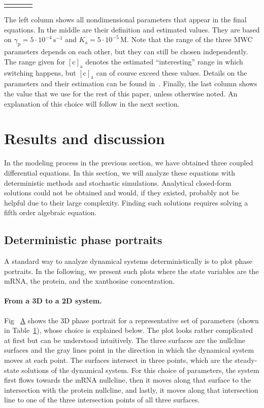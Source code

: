 \documentclass[10pt,letterpaper]{article}
\newlength\savedwidth
\newcommand\thickhline{\noalign{\global\savedwidth\arrayrulewidth\global\arrayrulewidth 2pt}%
	\hline
	\noalign{\global\arrayrulewidth\savedwidth}}
\newcommand{\unit}[1]{\,\mathrm{#1}}
\newcommand{\n}[1]{\mathrm{#1}}
\newcommand\subref[2]{%
	\def\myref{\getrefnumber{#1}}%
	\hyperref[#1]{\myref\mbox{#2}}%
}
\begin{document}
\begin{table}
\begin{tabular}{rllr}
			\thickhline
		\end{tabular}
		\begin{flushleft} 
			The left column shows all nondimensional parameters that appear in
			the final equations. In the middle are their definition and
			estimated values. They are based on $\gamma_{\n{p}} = 5 \cdot
			10^{-4} \unit{s^{-1}}$ and $K_{\n{a}} = 5 \cdot 10^{-5} \unit{M}$.
			Note that the range of the three MWC parameters depends on each
			other, but they can still be chosen independently. The range given
			for $\n{[c]_{a}}$ denotes the estimated ``interesting'' range in
			which switching happens, but $\n{[c]_{a}}$ can of course exceed
			these values. Details on the parameters and their estimation can be
			found in~. Finally, the last column shows the value
			that we use for the rest of this paper, unless otherwise noted. An
			explanation of this choice will follow in the next section.
		\end{flushleft}
		\label{table1:nondim}
	\end{table}
	
	
	\section*{Results and discussion}
	In the modeling process in the previous section, we have obtained three
	coupled differential equations. In this section, we will analyze these
	equations with deterministic methods and stochastic simulations. Analytical
	closed-form solutions could not be obtained and would, if they existed,
	probably not be helpful due to their large complexity. Finding such
	solutions requires solving a fifth order algebraic equation.
	
	\subsection*{Deterministic phase portraits}
	A standard way to analyze dynamical systems deterministically is
	to plot phase portraits. In the following, we present such plots where the
	state variables are the mRNA, the protein, and the xanthosine concentration.
	
	\paragraph*{From a 3D to a 2D system.} 
	Fig~\subref{fig4:bistability}{A} shows the 3D phase portrait for a
	representative set of parameters (shown in Table~\ref{table1:nondim}),
	whose choice is explained below. The plot looks rather complicated at first
	but can be understood intuitively. The three surfaces are the nullcline surfaces and
	the gray lines point in the direction in which the dynamical system moves at
	each point. The surfaces intersect in three points, which are the steady-state
	solutions of the dynamical system. For this choice of parameters, the system
	first flows towards the mRNA nullcline, then it moves along that surface to
	the intersection with the protein nullcline, and lastly, it moves along that
	intersection line to one of the three intersection points of all three
	surfaces.
	
\end{document}
